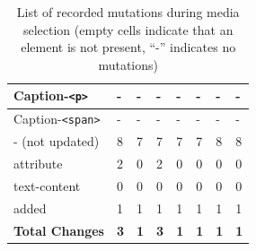 \documentclass[a4paper, 12pt]{article}
\begin{document}
\begin{table}[!ht]
\begin{adjustbox}{angle=90}
\begin{tabular}{|l|l|l|l|l|l|l|l|}
      Caption-\verb|<p>|              & -                 & -               & -                   & -             & -               & -               & -               \\ \hline
      Caption-\verb|<span>|           & -                 & -               & -                   & -             & -               & -               & -               \\ \hline
      \hline
      - (not updated)                 & 8                 & 7               & 7                   & 7             & 7               & 8               & 8               \\ \hline
      \hline
      attribute                       & 2                 & 0               & 2                   & 0             & 0               & 0               & 0               \\ \hline
      text-content                    & 0                 & 0               & 0                   & 0             & 0               & 0               & 0               \\ \hline
      added                           & 1                 & 1               & 1                   & 1             & 1               & 1               & 1               \\ \hline\hline
      \textbf{Total Changes}          & \textbf{3}        & \textbf{1}      & \textbf{3}          & \textbf{1}    & \textbf{1}      & \textbf{1}      & \textbf{1}      \\ \hline
    \end{tabular}
  \end{adjustbox}
  \caption{List of recorded mutations during media selection (empty cells indicate that an element is not present, \enquote{-} indicates no mutations)}
  \label{tab:mutations:mediaSelection}
\end{table}
\end{document}
